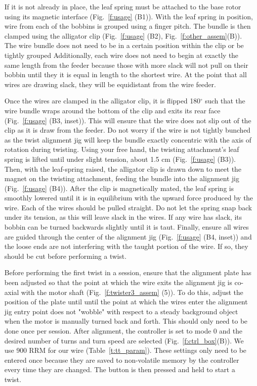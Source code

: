 \documentclass[11pt,a4paper]{article}
\begin{document}
If it is not already in place, the leaf spring must be attached to the base
rotor using its magnetic interface (Fig.~\ref{f:usage} (B1)). With the leaf
spring in position, wire from each of the bobbins is grouped using a finger
pitch. The bundle is then clamped using the alligator clip (Fig.~\ref{f:usage}
(B2), Fig.~\ref{f:other_assem}(B)). The wire bundle does not need to be in a
certain position within the clip or be tightly grouped Additionally, each wire
does not need to begin at exactly the same length from the feeder because those
with more slack will not pull on their bobbin until they it is equal in length
to the shortest wire. At the point that all wires are drawing slack, they will
be equidistant from the wire feeder.

Once the wires are clamped in the alligator clip, it is flipped 180$^{\circ}$
such that the wire bundle wraps around the bottom of the clip and exits its
rear face (Fig.~\ref{f:usage} (B3, inset)). This will ensure that the wire does
not slip out of the clip as it is draw from the feeder. Do not worry if the
wire is not tightly bunched as the twist alignment jig will keep the bundle
exactly concentric with the axis of rotation during twisting. Using your free
hand, the twisting attachment's leaf spring is lifted until under slight
tension, about 1.5 cm (Fig.~\ref{f:usage} (B3)). Then, with the leaf-spring
raised, the alligator clip is drawn down to meet the magnet on the twisting
attachment, feeding the bundle into the alignment jig (Fig.~\ref{f:usage}
(B4)). After the clip is magnetically mated, the leaf spring is smoothly
lowered until it is in equilibrium with the upward force produced by the wire.
Each of the wires should be pulled straight. Do not let the spring snap back
under its tension, as this will leave slack in the wires. If any wire has
slack, its bobbin can be turned backwards slightly until it is taut. Finally,
ensure all wires are guided through the center of the alignment jig
(Fig.~\ref{f:usage} (B4, inset)) and the loose ends are not interfering with
the taught portion of the wire. If so, they should be cut before performing a
twist.

Before performing the first twist in a session, ensure that the alignment plate
has been adjusted so that the point at which the wire exits the alignment jig
is co-axial with the motor shaft (Fig.~\ref{f:twister3_assem} (5)). To do this,
adjust the position of the plate until until the point at which the wires enter
the alignment jig entry point does not "wobble" with respect to a steady
background object when the motor is manually turned back and forth. This should
only need to be done once per session. After alignment, the controller is set
to mode 0 and the desired number of turns and turn speed are selected
(Fig.~\ref{f:ctrl_box}(B)). We use 900 RRM for our wire
(Table~\ref{t:tt_param}). These settings only need to be entered once because
they are saved to non-volatile memory by the controller every time they are
changed. The button is then pressed and held to start a twist.
\end{document}
